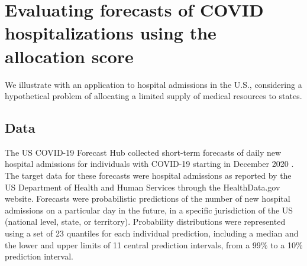 \documentclass{article}\usepackage[]{graphicx}\usepackage[]{xcolor}
\begin{document}
\section{Evaluating forecasts of COVID hospitalizations using the allocation score}
\label{sec:application}

We illustrate with an application to hospital admissions in the U.S., considering a hypothetical problem of allocating a limited supply of medical resources to states.

\subsection{Data}




The US COVID-19 Forecast Hub collected short-term forecasts of daily new hospital admissions for individuals with COVID-19 starting in December 2020 \citep{cramer_united_2022}.
The target data for these forecasts were hospital admissions as reported by the US Department of Health and Human Services through the HealthData.gov website.
Forecasts were probabilistic predictions of the number of new hospital admissions on a particular day in the future, in a specific jurisdiction of the US (national level, state, or territory).
Probability distributions were represented using a set of 23 quantiles for each individual prediction, including a median and the lower and upper limits of 11 central prediction intervals, from a 99\% to a 10\% prediction interval.
\end{document}
